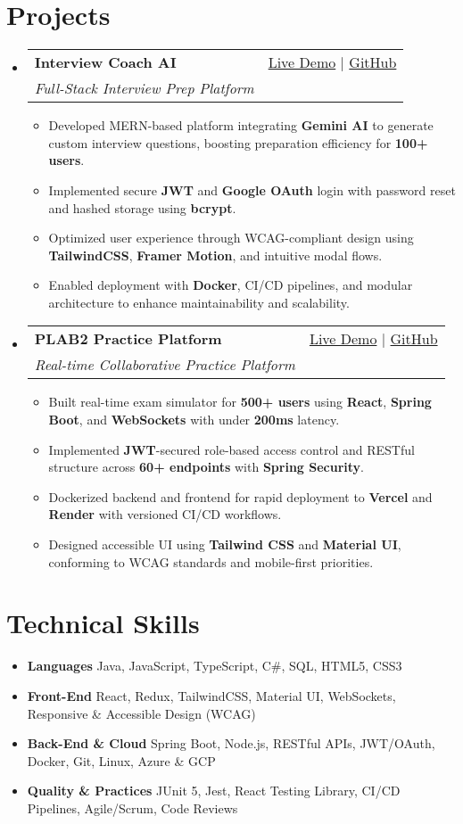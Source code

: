 \documentclass[letterpaper,11pt]{article}
\makeatletter
\newcommand{\resumeItem}[1]{\item\small{#1 \vspace{-2pt}}}
\newcommand{\resumeSubheading}[4]{
  \vspace{-1pt}\item
    \begin{tabular*}{0.97\textwidth}[t]{l@{\extracolsep{\fill}}r}
      \textbf{#1} & #2 \\
      \textit{\small#3} & \textit{\small #4} \\
    \end{tabular*}\vspace{-5pt}
}
\newcommand{\resumeSubHeadingListStart}{\begin{itemize}[leftmargin=*]}
\newcommand{\resumeSubHeadingListEnd}{\end{itemize}}
\newcommand{\resumeItemListStart}{\begin{itemize}}
\newcommand{\resumeItemListEnd}{\end{itemize}\vspace{-5pt}}
\makeatother
\begin{document}
\section{Projects}
  \resumeSubHeadingListStart
    \resumeSubheading
      {\textbf{Interview Coach AI}}{\href{https://interviewcoach-ai.vercel.app}{Live Demo} | \href{https://github.com/altansaid/interviewcoach-ai}{GitHub}}
      {Full-Stack Interview Prep Platform}{}
      \resumeItemListStart
        \resumeItem{Developed MERN-based platform integrating \textbf{Gemini AI} to generate custom interview questions, boosting preparation efficiency for \textbf{100+ users}.}
        \resumeItem{Implemented secure \textbf{JWT} and \textbf{Google OAuth} login with password reset and hashed storage using \textbf{bcrypt}.}
        \resumeItem{Optimized user experience through WCAG-compliant design using \textbf{TailwindCSS}, \textbf{Framer Motion}, and intuitive modal flows.}
        \resumeItem{Enabled deployment with \textbf{Docker}, CI/CD pipelines, and modular architecture to enhance maintainability and scalability.}
      \resumeItemListEnd

    \resumeSubheading
      {\textbf{PLAB2 Practice Platform}}{\href{https://plab2practice.com}{Live Demo} | \href{https://github.com/altansaid/plab2projectnew}{GitHub}}
      {Real-time Collaborative Practice Platform}{}
      \resumeItemListStart
        \resumeItem{Built real-time exam simulator for \textbf{500+ users} using \textbf{React}, \textbf{Spring Boot}, and \textbf{WebSockets} with under \textbf{200ms} latency.}
        \resumeItem{Implemented \textbf{JWT}-secured role-based access control and RESTful structure across \textbf{60+ endpoints} with \textbf{Spring Security}.}
        \resumeItem{Dockerized backend and frontend for rapid deployment to \textbf{Vercel} and \textbf{Render} with versioned CI/CD workflows.}
        \resumeItem{Designed accessible UI using \textbf{Tailwind CSS} and \textbf{Material UI}, conforming to WCAG standards and mobile-first priorities.}
      \resumeItemListEnd
  \resumeSubHeadingListEnd

\section{Technical Skills}
  \resumeItemListStart
    \resumeItem{\textbf{Languages}}{Java, JavaScript, TypeScript, C\#, SQL, HTML5, CSS3}
    \resumeItem{\textbf{Front-End}}{React, Redux, TailwindCSS, Material UI, WebSockets, Responsive \& Accessible Design (WCAG)}
    \resumeItem{\textbf{Back-End \& Cloud}}{Spring Boot, Node.js, RESTful APIs, JWT/OAuth, Docker, Git, Linux, Azure \& GCP}
    \resumeItem{\textbf{Quality \& Practices}}{JUnit 5, Jest, React Testing Library, CI/CD Pipelines, Agile/Scrum, Code Reviews}
  \resumeItemListEnd
\end{document}
